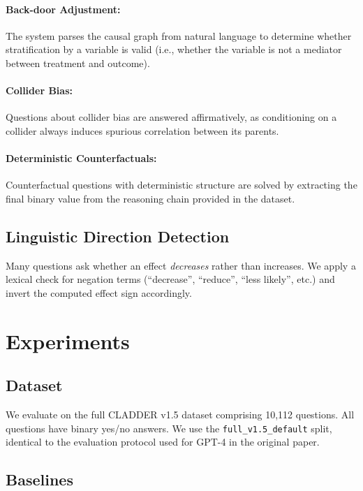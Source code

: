 \documentclass[11pt]{article}
\begin{document}
\paragraph{Back-door Adjustment:}
The system parses the causal graph from natural language to determine
whether stratification by a variable is valid (i.e., whether the variable
is not a mediator between treatment and outcome).

\paragraph{Collider Bias:}
Questions about collider bias are answered affirmatively, as conditioning
on a collider always induces spurious correlation between its parents.

\paragraph{Deterministic Counterfactuals:}
Counterfactual questions with deterministic structure are solved by
extracting the final binary value from the reasoning chain provided
in the dataset.

\subsection{Linguistic Direction Detection}

Many questions ask whether an effect \textit{decreases} rather than
increases. We apply a lexical check for negation terms
(``decrease'', ``reduce'', ``less likely'', etc.) and invert the
computed effect sign accordingly.

\section{Experiments}

\subsection{Dataset}

We evaluate on the full CLADDER v1.5 dataset \cite{jin2023cladder}
comprising 10,112 questions. All questions have binary yes/no answers.
We use the \texttt{full\_v1.5\_default} split, identical to the
evaluation protocol used for GPT-4 in the original paper.

\subsection{Baselines}
\end{document}
